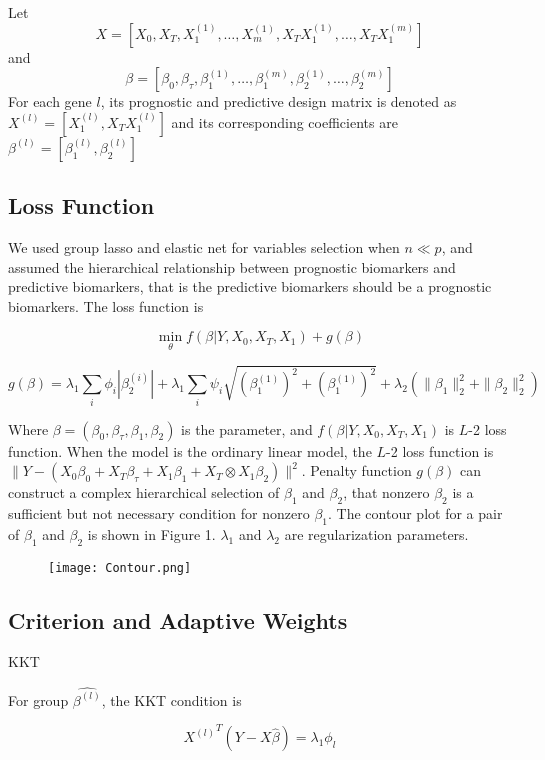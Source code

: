 \documentclass[12pt]{article}
\begin{document}
Let $$X=[X_0,X_T,X_1^{(1)},\dots,X_m^{(1)},X_TX_1^{(1)},\dots,X_TX_1^{(m)}]$$ and $$\beta=[\beta_0,\beta_\tau,\beta_1^{(1)},\dots,\beta_1^{(m)},\beta_2^{(1)},\dots,\beta_2^{(m)}]$$ For each gene $l$, its prognostic and predictive design matrix is denoted as $X^{(l)}=[X_1^{(l)},X_TX_1^{(l)}]$ and its corresponding coefficients are $\beta^{(l)}=[\beta_1^{(l)},\beta_2^{(l)}]$

\subsection*{Loss Function}

We used group lasso and elastic net for variables selection when $n\ll p$, and assumed the hierarchical relationship between prognostic biomarkers and predictive biomarkers, that is the predictive biomarkers should be a prognostic biomarkers. The loss function is 

$$\min_{\theta} f(\beta|Y,X_0,X_T,X_1) + g(\beta)$$

$$g(\beta)=\lambda_1\sum_i\phi_i|\beta_2^{(i)}|+\lambda_1\sum_i\psi_i\sqrt{(\beta_1^{(1)})^2+(\beta_1^{(1)})^2}+\lambda_2(\parallel\beta_1\parallel_2^2+\parallel\beta_2\parallel_2^2)$$

Where $\beta=(\beta_0,\beta_\tau,\beta_1,\beta_2)$ is the parameter, and $f(\beta|Y,X_0,X_T,X_1) $ is $L$-2 loss function. When the model is the ordinary linear model, the $L$-2 loss function is $\parallel Y-(X_0\beta_0 + X_T\beta_\tau + X_1\beta_1+ X_T\otimes X_1 \beta_2) \parallel^2$. Penalty function $g(\beta)$ can construct a complex hierarchical selection of $\beta_1$ and $\beta_2$, that nonzero $\beta_2$ is a sufficient but not necessary condition for nonzero $\beta_1$. The contour plot for a pair of $\beta_1$ and $\beta_2$ is shown in Figure 1. $\lambda_1$ and $\lambda_2$ are regularization parameters.

\begin{figure}[t]
\texttt{[image: Contour.png]}
\centering
\end{figure}


\subsection*{Criterion and Adaptive Weights} 

KKT \cite{tibshirani2013lasso}

For group $\hat{\beta^{(l)}}$, the KKT condition is 

$${X^{(l)}}^T(Y-X\hat{\beta})=\lambda_1\phi_l$$ 
\end{document}
